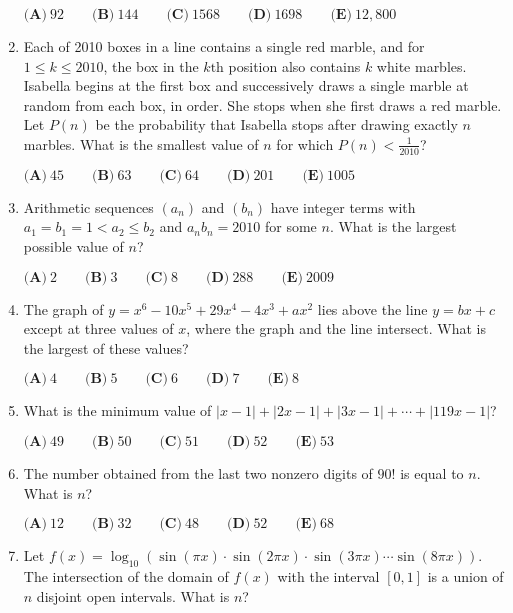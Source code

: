 \documentclass{article}
\begin{document}
\begin{enumerate}[label=\arabic*., itemsep=0.5em]
$\textbf{(A)}\ 92 \qquad \textbf{(B)}\ 144 \qquad \textbf{(C)}\ 1568 \qquad \textbf{(D)}\ 1698 \qquad \textbf{(E)}\ 12,800$\par \vspace{0.5em}\item Each of 2010 boxes in a line contains a single red marble, and for $1 \le k \le 2010$, the box in the $k\text{th}$ position also contains $k$ white marbles. Isabella begins at the first box and successively draws a single marble at random from each box, in order. She stops when she first draws a red marble. Let $P(n)$ be the probability that Isabella stops after drawing exactly $n$ marbles. What is the smallest value of $n$ for which $P(n) < \frac{1}{2010}$?

$\textbf{(A)}\ 45 \qquad \textbf{(B)}\ 63 \qquad \textbf{(C)}\ 64 \qquad \textbf{(D)}\ 201 \qquad \textbf{(E)}\ 1005$\par \vspace{0.5em}\item Arithmetic sequences $\left(a_n\right)$ and $\left(b_n\right)$ have integer terms with $a_1=b_1=1<a_2 \le b_2$ and $a_n b_n = 2010$ for some $n$. What is the largest possible value of $n$?

$\textbf{(A)}\ 2 \qquad \textbf{(B)}\ 3 \qquad \textbf{(C)}\ 8 \qquad \textbf{(D)}\ 288 \qquad \textbf{(E)}\ 2009$\par \vspace{0.5em}\item The graph of $y=x^6-10x^5+29x^4-4x^3+ax^2$ lies above the line $y=bx+c$ except at three values of $x$, where the graph and the line intersect. What is the largest of these values?

$\textbf{(A)}\ 4 \qquad \textbf{(B)}\ 5 \qquad \textbf{(C)}\ 6 \qquad \textbf{(D)}\ 7 \qquad \textbf{(E)}\ 8$\par \vspace{0.5em}\item What is the minimum value of $\left|x-1\right| + \left|2x-1\right| + \left|3x-1\right| + \cdots + \left|119x - 1 \right|$?

$\textbf{(A)}\ 49 \qquad \textbf{(B)}\ 50 \qquad \textbf{(C)}\ 51 \qquad \textbf{(D)}\ 52 \qquad \textbf{(E)}\ 53$\par \vspace{0.5em}\item The number obtained from the last two nonzero digits of $90!$ is equal to $n$. What is $n$?

$\textbf{(A)}\ 12 \qquad \textbf{(B)}\ 32 \qquad \textbf{(C)}\ 48 \qquad \textbf{(D)}\ 52 \qquad \textbf{(E)}\ 68$\par \vspace{0.5em}\item Let $f(x) = \log_{10} \left(\sin(\pi x) \cdot \sin(2 \pi x) \cdot \sin (3 \pi x) \cdots \sin(8 \pi x)\right)$. The intersection of the domain of $f(x)$ with the interval $[0,1]$ is a union of $n$ disjoint open intervals. What is $n$?


\end{enumerate}
\end{document}
